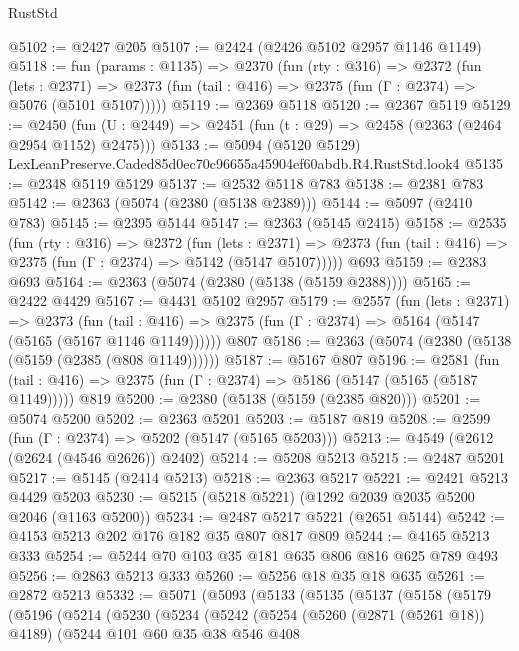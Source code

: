 \begin{lexlean}{RustStd}
\begin{coremodule}
@5102 := @2427 @205
@5107 := @2424 (@2426 @5102 @2957 @1146 @1149)
@5118 := fun (params : @1135) =>
  @2370
    (fun (rty : @316) =>
    @2372
      (fun (lets : @2371) =>
      @2373 (fun (tail : @416) => @2375 (fun (Γ : @2374) => @5076 (@5101 @5107)))))
@5119 := @2369 @5118
@5120 := @2367 @5119
@5129 := @2450 (fun (U : @2449) => @2451 (fun (t : @29) => @2458 (@2363 (@2464 @2954 @1152) @2475)))
@5133 := @5094 (@5120 @5129) LexLeanPreserve.Caded85d0ec70c96655a45904ef60abdb.R4.RustStd.look4
@5135 := @2348 @5119 @5129
@5137 := @2532 @5118 @783
@5138 := @2381 @783
@5142 := @2363 (@5074 (@2380 (@5138 @2389)))
@5144 := @5097 (@2410 @783)
@5145 := @2395 @5144
@5147 := @2363 (@5145 @2415)
@5158 := @2535
    (fun (rty : @316) =>
    @2372
      (fun (lets : @2371) =>
      @2373 (fun (tail : @416) => @2375 (fun (Γ : @2374) => @5142 (@5147 @5107)))))
    @693
@5159 := @2383 @693
@5164 := @2363 (@5074 (@2380 (@5138 (@5159 @2388))))
@5165 := @2422 @4429
@5167 := @4431 @5102 @2957
@5179 := @2557
    (fun (lets : @2371) =>
    @2373
      (fun (tail : @416) => @2375 (fun (Γ : @2374) => @5164 (@5147 (@5165 (@5167 @1146 @1149))))))
    @807
@5186 := @2363 (@5074 (@2380 (@5138 (@5159 (@2385 (@808 @1149))))))
@5187 := @5167 @807
@5196 := @2581
    (fun (tail : @416) => @2375 (fun (Γ : @2374) => @5186 (@5147 (@5165 (@5187 @1149)))))
    @819
@5200 := @2380 (@5138 (@5159 (@2385 @820)))
@5201 := @5074 @5200
@5202 := @2363 @5201
@5203 := @5187 @819
@5208 := @2599 (fun (Γ : @2374) => @5202 (@5147 (@5165 @5203)))
@5213 := @4549 (@2612 (@2624 (@4546 @2626)) @2402)
@5214 := @5208 @5213
@5215 := @2487 @5201
@5217 := @5145 (@2414 @5213)
@5218 := @2363 @5217
@5221 := @2421 @5213 @4429 @5203
@5230 := @5215 (@5218 @5221) (@1292 @2039 @2035 @5200 @2046 (@1163 @5200))
@5234 := @2487 @5217 @5221 (@2651 @5144)
@5242 := @4153 @5213 @202 @176 @182 @35 @807 @817 @809
@5244 := @4165 @5213 @333
@5254 := @5244 @70 @103 @35 @181 @635 @806 @816 @625 @789 @493
@5256 := @2863 @5213 @333
@5260 := @5256 @18 @35 @18 @635
@5261 := @2872 @5213
@5332 := @5071
    (@5093
      (@5133
        (@5135
          (@5137
            (@5158
              (@5179
                (@5196
                  (@5214
                    (@5230
                      (@5234
                        (@5242
                          (@5254
                            (@5260 (@2871 (@5261 @18)) @4189)
                            (@5244
                              @101
                              @60
                              @35
                              @38
                              @546
                              @408

\end{coremodule}
\end{lexlean}
